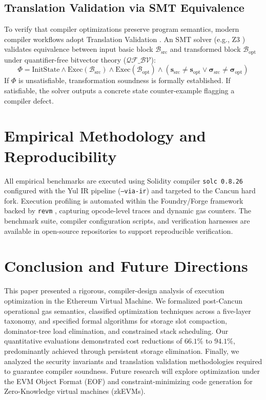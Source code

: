 \documentclass[conference]{IEEEtran}
\begin{document}
\subsection{Translation Validation via SMT Equivalence}
To verify that compiler optimizations preserve program semantics, modern compiler workflows adopt Translation Validation \cite{pnueli1998translation}. An SMT solver (e.g., Z3 \cite{demoura2008z3}) validates equivalence between input basic block $\mathcal{B}_{\text{src}}$ and transformed block $\mathcal{B}_{\text{opt}}$ under quantifier-free bitvector theory ($\mathcal{QF\_BV}$):
\begin{equation}
\Phi = \text{InitState} \land \text{Exec}(\mathcal{B}_{\text{src}}) \land \text{Exec}(\mathcal{B}_{\text{opt}}) \land (\mathbf{s}_{\text{src}} \ne \mathbf{s}_{\text{opt}} \lor \boldsymbol{\sigma}_{\text{src}} \ne \boldsymbol{\sigma}_{\text{opt}})
\end{equation}
If $\Phi$ is unsatisfiable, transformation soundness is formally established. If satisfiable, the solver outputs a concrete state counter-example flagging a compiler defect.

\section{Empirical Methodology and Reproducibility}
All empirical benchmarks are executed using Solidity compiler \texttt{solc 0.8.26} configured with the Yul IR pipeline (\texttt{--via-ir}) and targeted to the Cancun hard fork. Execution profiling is automated within the Foundry/Forge framework \cite{foundrybook} backed by \texttt{revm} \cite{revm}, capturing opcode-level traces and dynamic gas counters. The benchmark suite, compiler configuration scripts, and verification harnesses are available in open-source repositories to support reproducible verification.

\section{Conclusion and Future Directions}
This paper presented a rigorous, compiler-design analysis of execution optimization in the Ethereum Virtual Machine. We formalized post-Cancun operational gas semantics, classified optimization techniques across a five-layer taxonomy, and specified formal algorithms for storage slot compaction, dominator-tree load elimination, and constrained stack scheduling. Our quantitative evaluations demonstrated cost reductions of $66.1\%$ to $94.1\%$, predominantly achieved through persistent storage elimination. Finally, we analyzed the security invariants and translation validation methodologies required to guarantee compiler soundness. Future research will explore optimization under the EVM Object Format (EOF) and constraint-minimizing code generation for Zero-Knowledge virtual machines (zkEVMs).

\balance


\end{document}
